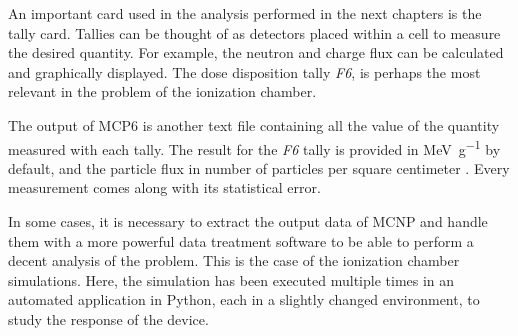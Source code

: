 An important card used in the analysis performed in the next chapters is the tally card. Tallies can be thought of as detectors placed within a cell to measure the desired quantity. For example, the neutron and charge flux can be calculated and graphically displayed. The dose disposition tally \textit{F6}, is perhaps the most relevant in the problem of the ionization chamber. 

The output of MCP6 is another text file containing all the value of the quantity measured with each tally. The result for the \textit{F6} tally is provided in \unit{\mega\electronvolt\per\gram} by default, and the particle flux in number of particles per square centimeter \cite{mcnp6Manual}. Every measurement comes along with its statistical error.

In some cases, it is necessary to extract the output data of MCNP and handle them with a more powerful data treatment software to be able to perform a decent analysis of the problem. This is the case of the ionization chamber simulations. Here, the simulation has been executed multiple times in an automated application in Python, each in a slightly changed environment, to study the response of the device. 
